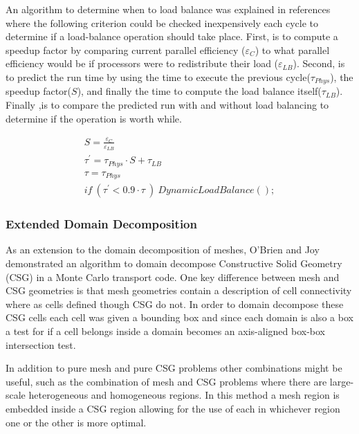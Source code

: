 An algorithm to determine when to load balance was explained in references~\cite{o2005dynamic}~\cite{procassini2005load} where the following criterion could be checked inexpensively each cycle to determine if a load-balance operation should take place.
%
First, is to compute a speedup factor by comparing current parallel efficiency ($ \varepsilon_C $) to what parallel efficiency would be if processors were to redistribute their load ($ \varepsilon_{LB} $).
%
Second, is to predict the run time by using the time to execute the previous cycle($ \tau_{Phys} $), the speedup factor($S$), and finally the time to compute the load balance itself($ \tau_{LB} $).
%
Finally ,is to compare the predicted run with and without load balancing to determine if the operation is worth while.~\cite{o2005dynamic}
~\cite{procassini2005load}

\begin{eqnarray}
S = \frac{\varepsilon_C}{\varepsilon_{LB}} \\
\tau^{'} = \tau_{Phys} \cdot S + \tau_{LB} \\
\tau = \tau_{Phys} \\
if\ (\tau^{'} < 0.9 \cdot \tau \ )\ DynamicLoadBalance();
\end{eqnarray}

\subsubsection*{Extended Domain Decomposition}

As an extension to the domain decomposition of meshes, O'Brien and Joy demonstrated an algorithm to domain decompose Constructive Solid Geometry (CSG) in a Monte Carlo transport code.
%
One key difference between mesh and CSG geometries is that mesh geometries contain a description of cell connectivity where as cells defined though CSG do not.
%
In order to domain decompose these CSG cells each cell was given a bounding box and since each domain is also a box a test for if a cell belongs inside a domain becomes an axis-aligned box-box intersection test.~\cite{o2009domain}
%

In addition to pure mesh and pure CSG problems other combinations might be useful, such as the combination of mesh and CSG problems where there are large-scale heterogeneous and homogeneous regions.
%
In this method a mesh region is embedded inside a CSG region allowing for the use of each in whichever region one or the other is more optimal.
~\cite{greenman2009enhancements}

